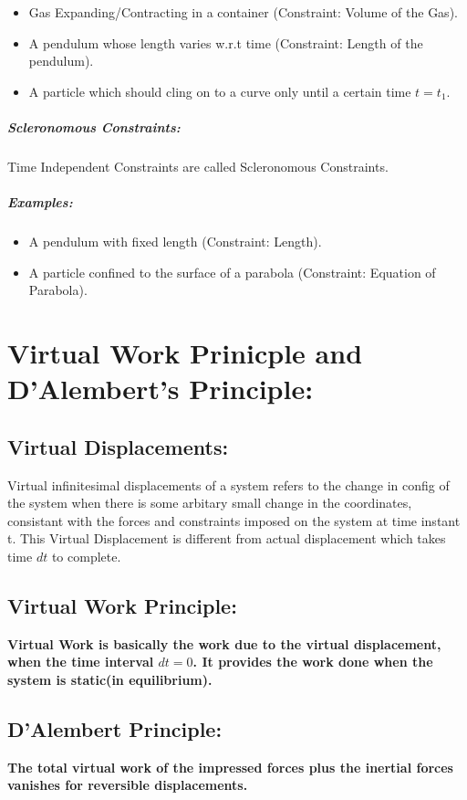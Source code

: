 \documentclass[a4paper]{article}
\begin{document}
			\begin{itemize}
				\item Gas Expanding/Contracting in a container (Constraint: Volume of the Gas).
				\item A pendulum whose length varies w.r.t time (Constraint: Length of the pendulum).
				\item A particle which should cling on to a curve only until a certain time $t=t_1$.
			\end{itemize}

		\subparagraph*{Scleronomous Constraints: }
			Time Independent Constraints are called Scleronomous Constraints.

			\subparagraph*{Examples: }

			\begin{itemize}
				\item A pendulum with fixed length (Constraint: Length).
				\item A particle confined to the surface of a parabola (Constraint: Equation of Parabola).
			\end{itemize}

	\section*{Virtual Work Prinicple and D'Alembert's Principle: }
		
		\subsection*{Virtual Displacements: }
		Virtual infinitesimal displacements of a system refers to the change in config of the system when there is some arbitary small change in the coordinates, consistant with the forces and constraints imposed on the system at time instant t. This Virtual Displacement is different from actual displacement which takes time $dt$ to complete.
		
		\subsection*{Virtual Work Principle: }
			\textbf{Virtual Work is basically the work due to the virtual displacement, when the time interval $dt=0$. It provides the work done when the system is static(in equilibrium).}

		\subsection*{D'Alembert Principle: } 
			\textbf{The total virtual work of the impressed forces plus the inertial forces vanishes for reversible displacements.}
\end{document}
